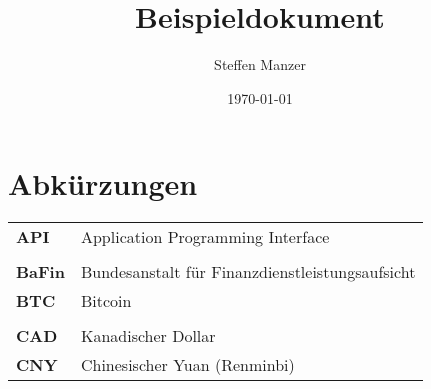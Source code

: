 \documentclass[
    twoside=true,
    fontsize=11pt,
    DIV=15,
    BCOR=17mm,
    headsepline=true, footsepline=false,
    open=right,
    a4paper,
    listof=totoc, bibliography=totoc,
    headinclude=true, footinclude=false,
    parskip=half,
    numbers=noenddot,
    ngerman
]{scrbook}
\title{Beispieldokument}
\author{Steffen Manzer}
\date{\today}
\begin{document}

    
    \setcounter{page}{1}
    
    
    \tableofcontents
    \newpage

    \listoffigures
    \newpage
    
    \listoftables
    \newpage
    
    
    
    \chapter*{Abkürzungen}

    \bgroup
    \renewcommand*{\arraystretch}{1.2} %
    \begin{longtable}[l]{ A{l} Z{l} }
    
    \textbf{API}    & Application Programming Interface \\
    \vspace{1mm} \\
    \textbf{BaFin}  & Bundesanstalt für Finanzdienstleistungsaufsicht \\
    \textbf{BTC}    & Bitcoin \\
    \vspace{1mm} \\
    \textbf{CAD}    & Kanadischer Dollar \\
    \textbf{CNY}    & Chinesischer Yuan (Renminbi) \\
    
    \end{longtable}
    \egroup
    \newpage
    
    
    

    \setcounter{page}{1}
\end{document}
